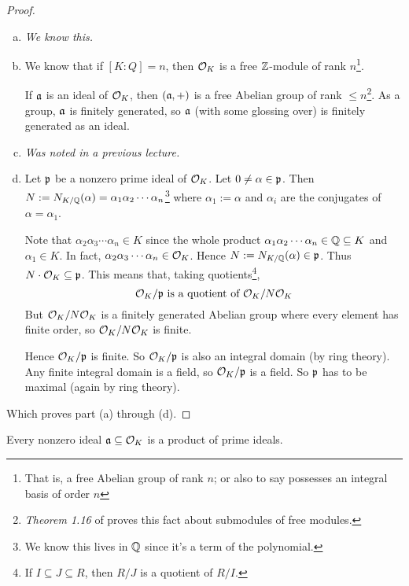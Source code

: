 \begin{proof}
    ~\begin{enumerate}[(a)]
        \item \emph{We know this.}
        \item
              We know that if $[K : Q] = n$, then $\mathcal{O}_K$ is a free $\mathbb Z$-module of rank $n$\footnote{That is, a free Abelian group of rank $n$; or also to say possesses an integral basis of order $n$}.

              If $\mathfrak{a}$ is an ideal of $\mathcal{O}_K$, then $(\mathfrak{a}, +)$ is a free Abelian group of rank $\leq n$\footnote{\emph{Theorem 1.16} of \cite{stewart2015algebraic} proves this fact about submodules of free modules.}. As a group, $\mathfrak{a}$ is finitely generated, so $\mathfrak{a}$ (with some glossing over) is finitely generated as an ideal.
        \item \emph{Was noted in a previous lecture.}
        \item
              Let $\mathfrak{p}$ be a nonzero prime ideal of $\mathcal{O}_K$. Let $0\neq \alpha\in\mathfrak{p}$. Then $N:= N_{K/\mathbb Q}(\alpha) = \alpha_1\alpha_2\cdots \alpha_n$\footnote{We know this lives in $\mathbb Q$ since it's a term of the polynomial.} where $\alpha_1 := \alpha$ and $\alpha_i$ are the conjugates of $\alpha = \alpha_1$.

              Note that $\alpha_2\alpha_3\cdots \alpha_n\in K$ since the whole product $\alpha_1\alpha_2 \cdots \alpha_n\in\mathbb Q\subseteq K$ and $\alpha_1\in K$. In fact, $\alpha_2\alpha_3\cdots \alpha_n\in\mathcal{O}_K$. Hence $N:= N_{K/\mathbb Q}(\alpha)\in\mathfrak{p}$. Thus $N\cdot \mathcal{O}_K\subseteq \mathfrak{p}$. This means that, taking quotients\footnote{If $I\subseteq J\subseteq R$, then $R/J$ is a quotient of $R/I$.},
              \[\mathcal{O}_K/\mathfrak{p}\text{ is a quotient of }\mathcal{O}_K/N\mathcal{O}_K\]
              But $\mathcal{O}_K/N\mathcal{O}_K$ is a finitely generated Abelian group where every element has finite order, so $\mathcal{O}_K/N\mathcal{O}_K$ is finite.

              Hence $\mathcal{O}_K/\mathfrak{p}$ is finite. So $\mathcal{O}_K/\mathfrak{p}$ is also an integral domain (by ring theory). Any finite integral domain is a field, so $\mathcal{O}_K/\mathfrak{p}$ is a field. So $\mathfrak{p}$ has to be maximal (again by ring theory).
    \end{enumerate}
    Which proves part (a) through (d).
\end{proof}
\begin{proposition}
    Every nonzero ideal $\mathfrak{a}\subseteq\mathcal{O}_K$ is a product of prime ideals.
\end{proposition}
